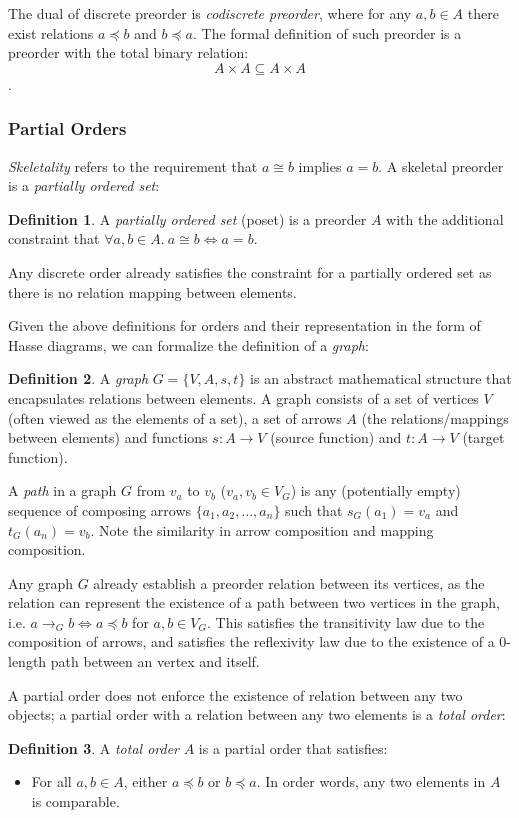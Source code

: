 \documentclass[12pt]{article}
\theoremstyle{definition}
\newtheorem{defn}{Definition}[section]
\begin{document}
	The dual of discrete preorder is \emph{codiscrete preorder}, where for any $a, b \in A$ there exist relations $a \preceq b$ and $b \preceq a$. The formal definition of such preorder is a preorder with the total binary relation: $$A \times A \subseteq A \times A$$.
	
	\subsubsection{Partial Orders}
	
	\emph{Skeletality} refers to the requirement that $a \cong b$ implies $a = b$. A skeletal preorder is a \emph{partially ordered set}:
	\begin{defn}
		A \emph{partially ordered set} (poset) is a preorder $A$ with the additional constraint that $\forall a, b \in A.\ a \cong b \iff a = b$.
	\end{defn}
	
	Any discrete order already satisfies the constraint for a partially ordered set as there is no relation mapping between elements.
	
	Given the above definitions for orders and their representation in the form of Hasse diagrams, we can formalize the definition of a \emph{graph}:
	\begin{defn}
		A \emph{graph} $G = \{V, A, s, t\}$ is an abstract mathematical structure that encapsulates relations between elements. A graph consists of a set of vertices $V$ (often viewed as the elements of a set), a set of arrows $A$ (the relations/mappings between elements) and functions $s: A \to V$ (source function) and $t: A \to V$ (target function).
	\end{defn}
	
	A \emph{path} in a graph $G$ from $v_a$ to $v_b$ ($v_a, v_b \in V_G$) is any (potentially empty) sequence of composing arrows $\{a_1, a_2, \dots, a_n\}$ such that $s_G(a_1) = v_a$ and $t_G(a_n) = v_b$. Note the similarity in arrow composition and mapping composition.
	
	Any graph $G$ already establish a preorder relation between its vertices, as the relation can represent the existence of a path between two vertices in the graph, i.e. $a \to_G b \iff a \preceq b$ for $a, b \in V_G$. This satisfies the transitivity law due to the composition of arrows, and satisfies the reflexivity law due to the existence of a $0$-length path between an vertex and itself.
	
	A partial order does not enforce the existence of relation between any two objects; a partial order with a relation between any two elements is a \emph{total order}:
	\begin{defn}
		A \emph{total order} $A$ is a partial order that satisfies:
		\begin{itemize}
			\item For all $a, b \in A$, either $a \preceq b$ or $b \preceq a$. In order words, any two elements in $A$ is comparable.
		\end{itemize}
	\end{defn}
	
	
	
\end{document}
